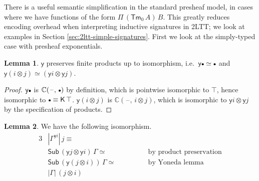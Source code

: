 \documentclass[12pt,a4paper,twoside,openany]{book}
\theoremstyle{remark}
\theoremstyle{definition}
\newtheorem{mylemma}{Lemma}
\theoremstyle{theorem}
\newcommand{\ms}[1]{\mathsf{#1}}
\newcommand{\mbb}[1]{\mathbb{#1}}
\newcommand{\Sub}{\mathsf{Sub}}
\newcommand{\Tm}{\mathsf{Tm}}
\newcommand{\blank}{\mathord{\hspace{1pt}\text{--}\hspace{1pt}}}
\newcommand{\emptycon}{\scaleobj{.75}\bullet}
\newcommand{\K}{\mathsf{K}}
\newcommand{\mbbC}{\mbb{C}}
\newcommand{\yon}{\ms{y}}
\begin{document}
There is a useful semantic simplification in the standard presheaf model, in
cases where we have functions of the form $\Pi\,(\Tm_0\,A)\,B$. This greatly
reduces encoding overhead when interpreting inductive signatures in 2LTT; we
look at examples in Section \ref{sec:2ltt-simple-signatures}. First we look at
the simply-typed case with presheaf exponentials.
\begin{mylemma}
$\yon$ preserves finite products up to isomorphism, i.e.\ $\yon \emptycon \simeq
  \emptycon$ and $\yon (i \otimes j) \simeq (\yon i \otimes \yon j)$.
\end{mylemma}
\begin{proof}
$\yon \emptycon$ is $\mbbC(\blank,\,\emptycon)$ by definition, which is
pointwise isomorphic to $\top$, hence isomorphic to $\emptycon \equiv
\K\,\top$. $\yon (i \otimes j)$ is $\mbbC(\blank,\,i \otimes j)$, which is
isomorphic to $\yon i \otimes \yon j$ by the specification of products.
\end{proof}
\begin{mylemma} We have the following isomorphism.
\begin{alignat*}{3}
  & |\Gamma^{\yon i}|\,j \equiv \hspace{3em}&&\\
  & \Sub\,(\yon j \otimes \yon i)\,\Gamma \simeq \hspace{3em} &&\text{by product preservation}\\
  & \Sub\,(\yon (j \otimes i))\,\Gamma \simeq \hspace{3em} &&\text {by Yoneda lemma}\\
  & |\Gamma|\,(j \otimes i)&&
\end{alignat*}
\end{mylemma}
\end{document}
